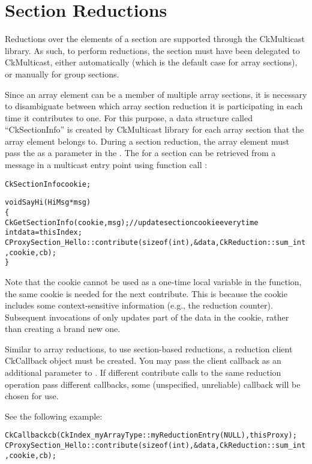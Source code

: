 \section{Section Reductions}

Reductions over the elements of a section are supported through the CkMulticast library.
As such, to perform reductions, the section must have been delegated to
CkMulticast, either automatically (which is the default case for array sections),
or manually for group sections.

Since an array element can be a member of multiple array sections,
it is necessary to disambiguate between which array
section reduction it is participating in each time it contributes to one. For this purpose, a data structure
called ``CkSectionInfo'' is created by CkMulticast library for each
array section that the array element belongs to.
During a section reduction, the array element must pass the
 as a parameter in the .
The  for a section can be retrieved
from a message in a multicast entry point using function call
:

\begin{alltt}
  CkSectionInfo cookie;

  void SayHi(HiMsg *msg)
  \{
    CkGetSectionInfo(cookie, msg);     // update section cookie every time
    int data = thisIndex;
    CProxySection_Hello::contribute(sizeof(int), &data, CkReduction::sum_int, cookie, cb);
  \}
\end{alltt}


Note that the cookie cannot be used as a one-time local variable in the 
function, the same cookie is needed for the next contribute. This is 
because the cookie includes some context-sensitive information (e.g., the 
reduction counter). Subsequent invocations of  only updates 
part of the data in the cookie, rather than creating a brand new one.

Similar to array reductions, to use section-based reductions, a
reduction client CkCallback object must be created. You may pass the
client callback as an additional parameter to . If
different contribute calls to the same reduction operation pass
different callbacks, some (unspecified, unreliable) callback will be
chosen for use. 

See the following example:

\begin{alltt}
    CkCallback cb(CkIndex_myArrayType::myReductionEntry(NULL),thisProxy); 
    CProxySection_Hello::contribute(sizeof(int), &data, CkReduction::sum_int, cookie, cb);
\end{alltt}

